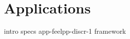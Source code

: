 \chapter{Applications}
\label{chap:applications}

{intro}
{specs}
{app-feelpp-discr-1}
{framework}


